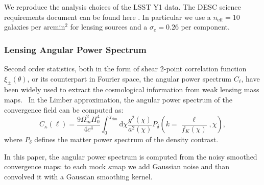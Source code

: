 \documentclass[twocolumn,twocolappendix]{aastex63}
\begin{document}
We reproduce the analysis choices of the LSST Y1 data. The DESC science requirements document can be found here \cite{mandelbaum2018lsst}.
In particular we use a $n_{\text{eff}}=10$ galaxies per $\text{arcmin}^2$ for lensing sources and a $\sigma_e=0.26$ per component.


\subsubsection{Lensing Angular Power Spectrum}
Second order statistics, both in the form of shear 2-point correlation function $\xi_{\pm}(\theta)$, or its counterpart in Fourier space, the angular power spectrum $C_{\ell}$, have been widely used to extract the cosmological information from weak lensing mass maps. \
In the Limber approximation, the angular power spectrum of the convergence field can be computed as:
\begin{equation}
    C_{\kappa}(\ell)=\frac{9\Omega_m^2H_0^4}{4c^4}
    \int_0^{\chi_{lim}} \text{d}\chi 
    \frac{g^2(\chi)}{a^2(\chi)}P_{\delta}
    	\left( k=\frac{\ell}{f_K(\chi)},\chi \right),
\end{equation}
where $P_{\delta}$ defines the matter power spectrum of the density contrast.

In this paper, the angular power spectrum is computed from the noisy smoothed convergence maps: to each mock $\kappa$map we add Gaussian noise and than convolved it with a Gaussian smoothing kernel.
\end{document}
